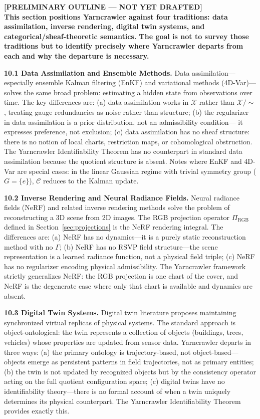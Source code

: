 \documentclass[12pt, oneside]{article}
\newcommand{\preliminary}[1]{%
  \colorbox{yellow!20}{\parbox{\dimexpr\linewidth-2\fboxsep}{%
    \textbf{\textcolor{red!70!black}{[PRELIMINARY OUTLINE --- NOT YET DRAFTED]}}\\[4pt]
    #1
  }}%
}
\newcommand{\Xmod}{\mathcal{X}/{\sim}}
\begin{document}
\preliminary{
\textbf{This section positions Yarncrawler against four traditions: data assimilation,
inverse rendering, digital twin systems, and categorical/sheaf-theoretic semantics.
The goal is not to survey those traditions but to identify precisely where Yarncrawler
departs from each and why the departure is necessary.}

\medskip
\textbf{10.1 Data Assimilation and Ensemble Methods.}
Data assimilation---especially ensemble Kalman filtering (EnKF) and variational methods
(4D-Var)---solves the same broad problem: estimating a hidden state from observations
over time. The key differences are: (a) data assimilation works in $\mathcal{X}$ rather
than $\Xmod$, treating gauge redundancies as noise rather than structure; (b) the
regularizer in data assimilation is a prior distribution, not an admissibility condition---
it expresses preference, not exclusion; (c) data assimilation has no sheaf structure:
there is no notion of local charts, restriction maps, or cohomological obstruction. The
Yarncrawler Identifiability Theorem has no counterpart in standard data assimilation
because the quotient structure is absent. Notes where EnKF and 4D-Var are special cases:
in the linear Gaussian regime with trivial symmetry group ($G = \{e\}$), $\mathcal{C}$
reduces to the Kalman update.

\medskip
\textbf{10.2 Inverse Rendering and Neural Radiance Fields.}
Neural radiance fields (NeRF) and related inverse rendering methods solve the problem of
reconstructing a 3D scene from 2D images. The RGB projection operator $\Pi_{\mathrm{RGB}}$
defined in Section~\ref{sec:projections} is the NeRF rendering integral. The differences
are: (a) NeRF has no dynamics---it is a purely static reconstruction method with no
$\Gamma$; (b) NeRF has no RSVP field structure---the scene representation is a learned
radiance function, not a physical field triple; (c) NeRF has no regularizer encoding
physical admissibility. The Yarncrawler framework strictly generalizes NeRF: the RGB
projection is one chart of the cover, and NeRF is the degenerate case where only that
chart is available and dynamics are absent.

\medskip
\textbf{10.3 Digital Twin Systems.}
Digital twin literature proposes maintaining synchronized virtual replicas of physical
systems. The standard approach is object-ontological: the twin represents a collection of
objects (buildings, trees, vehicles) whose properties are updated from sensor data.
Yarncrawler departs in three ways: (a) the primary ontology is trajectory-based, not
object-based---objects emerge as persistent patterns in field trajectories, not as primary
entities; (b) the twin is not updated by recognized objects but by the consistency
operator acting on the full quotient configuration space; (c) digital twins have no
identifiability theory---there is no formal account of when a twin uniquely determines
its physical counterpart. The Yarncrawler Identifiability Theorem provides exactly this.

}
\end{document}
